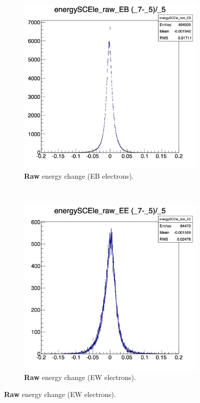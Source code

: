 \documentclass[10pt]{article}
\begin{document}
\begin{figure}[h!]
        \centering
        \begin{subfigure}[b]{0.4\textwidth}
                \includegraphics[width=\textwidth]{Plots/rawEnergySC_EB}
                \caption{\textbf{Raw} energy change (EB electrons).}
                \label{rawEB}
                
        \end{subfigure}%
        ~ %
        \begin{subfigure}[b]{0.4\textwidth}
                \includegraphics[width=\textwidth]{Plots/rawEnergySC_EE}
                \caption{\textbf{Raw} energy change (EW electrons).}
                \label{rawEE}
            

\end{subfigure}
\end{figure}
\end{document}
